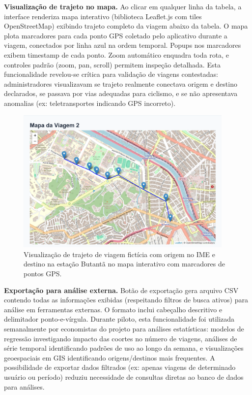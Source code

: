 \textbf{Visualização de trajeto no mapa.} Ao clicar em qualquer linha da tabela, a interface renderiza mapa interativo (biblioteca Leaflet.js com tiles OpenStreetMap) exibindo trajeto completo da viagem abaixo da tabela. O mapa plota marcadores para cada ponto GPS coletado pelo aplicativo durante a viagem, conectados por linha azul na ordem temporal. Popups nos marcadores exibem timestamp de cada ponto. Zoom automático enquadra toda rota, e controles padrão (zoom, pan, scroll) permitem inspeção detalhada. Esta funcionalidade revelou-se crítica para validação de viagens contestadas: administradores visualizavam se trajeto realmente conectava origem e destino declarados, se passava por vias adequadas para ciclismo, e se não apresentava anomalias (ex: teletransportes indicando GPS incorreto).

\begin{figure}[H]
    \centering
    \includegraphics[width=0.95\textwidth]{figuras/mapa_contestacao.PNG}
    \caption{Visualização de trajeto de viagem fictícia com origem no IME e destino na estação Butantã no mapa interativo com marcadores de pontos GPS.}
    \label{fig:mapa_contestacao}
  \end{figure}

\textbf{Exportação para análise externa.} Botão de exportação gera arquivo CSV contendo todas as informações exibidas (respeitando filtros de busca ativos) para análise em ferramentas externas. O formato inclui cabeçalho descritivo e delimitador ponto-e-vírgula. Durante piloto, esta funcionalidade foi utilizada semanalmente por economistas do projeto para análises estatísticas: modelos de regressão investigando impacto das coortes no número de viagens, análises de série temporal identificando padrões de uso ao longo da semana, e visualizações geoespaciais em GIS identificando origens/destinos mais frequentes. A possibilidade de exportar dados filtrados (ex: apenas viagens de determinado usuário ou período) reduziu necessidade de consultas diretas ao banco de dados para análises.

